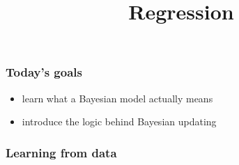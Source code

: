 \documentclass{beamer}
\title{Regression}
\date{}
\begin{document}
\begin{frame}
  \maketitle
\end{frame}


\begin{frame}
  \frametitle{Today's goals}

  \begin{itemize}
    \item learn what a Bayesian model actually means
    \item introduce the logic behind Bayesian updating
  \end{itemize}
\end{frame}

\begin{frame}
  \frametitle{Learning from data}
\end{frame}
\end{document}
